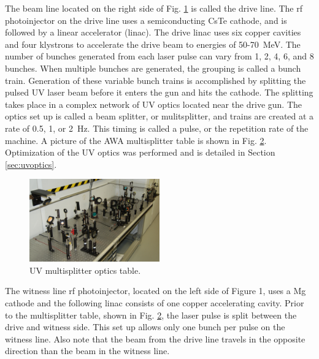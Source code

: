 \documentclass{iitthesis}
\begin{document}
The beam line located on the right side of Fig. \ref{fig:bunker} is called the
drive line. The rf photoinjector on the drive line uses a semiconducting
CsTe cathode, and is followed by a linear accelerator (linac). The
drive linac uses six copper cavities and four klystrons to accelerate the drive beam
to energies of 50-\SI{70}{MeV}. The number of bunches generated from each 
laser pulse can vary from 1, 2, 4, 6, and 8 bunches. When multiple bunches
are generated, the grouping is called a bunch train. Generation of
these variable bunch trains is accomplished by splitting the pulsed
UV laser beam before it enters the gun and hits the cathode. The splitting
takes place in a complex network of UV optics located near the drive
gun. The optics set up is called a beam splitter, or mulitsplitter,
and trains are created at a rate of 0.5, 1, or \SI{2}{Hz}. This timing is
called a pulse, or the repetition rate of the machine. A picture of
the AWA multisplitter table is shown in Fig. \ref{fig:optics}. Optimization 
of the UV optics was performed and is detailed in Section \ref{sec:uvoptics}.  
\begin{figure}
	\begin{center}
		\label{fig:bunker}
	\end{center}
\end{figure}
\begin{figure}[h]
	\begin{center}
		\includegraphics[width=0.5\textwidth]{images/multisplitter}\caption{UV multisplitter optics table.}
	\end{center}
	\label{fig:optics}
\end{figure}

The witness line rf photoinjector, located on the left side of Figure
1, uses a Mg cathode and the following linac consists of one copper
accelerating cavity. Prior to the multisplitter table, shown in
Fig. \ref{fig:optics}, the laser pulse is split between the drive and witness side.
This set up allows only one bunch per pulse on the witness line. Also
note that the beam from the drive line travels in the opposite direction
than the beam in the witness line. 
\end{document}
